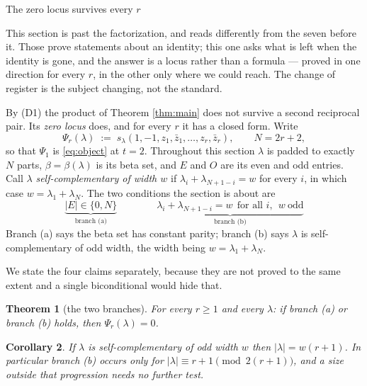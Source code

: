 \documentclass[11pt,reqno]{amsart}
\makeatletter
\renewcommand\section{\@startsection{section}{1}%
  \z@{\linespacing\@plus\linespacing}{.5\linespacing}%
  {\normalfont\large\bfseries\centering}}
\theoremstyle{plain}
\newtheorem{theorem}{Theorem}[section]
\newtheorem{corollary}[theorem]{Corollary}
\theoremstyle{definition}
\makeatother
\begin{document}
\section{The zero locus survives every $r$}\label{sec:zeros}

This section is past the factorization, and reads differently from the seven before it. Those prove
statements about an identity; this one asks what is left when the identity is gone, and the answer is
a locus rather than a formula --- proved in one direction for every $r$, in the other only where we
could reach. The change of register is the subject changing, not the standard.

By (D1) the product of Theorem \ref{thm:main} does not survive a second reciprocal pair. Its
\emph{zero locus} does, and for every $r$ it has a closed form. Write
\begin{equation}\label{eq:psir}
\Psi_r(\lambda)\;:=\;s_\lambda(1,-1,z_1,\bar z_1,\dots,z_r,\bar z_r),\qquad N=2r+2,
\end{equation}
so that $\Psi_1$ is \eqref{eq:object} at $t=2$. Throughout this section $\lambda$ is padded to
exactly $N$ parts, $\beta=\beta(\lambda)$ is its beta set, and $E$ and $O$ are its even and odd
entries. Call $\lambda$ \emph{self-complementary of width $w$} if $\lambda_i+\lambda_{N+1-i}=w$ for
every $i$, in which case $w=\lambda_1+\lambda_N$. The two conditions the section is about are
\begin{equation}\label{eq:branches}
\boxed{\;\;
\underbrace{|E|\in\{0,N\}}_{\text{branch (a)}}
\qquad\qquad
\underbrace{\lambda_i+\lambda_{N+1-i}=w\ \ \text{for all }i,\ \ w\ \text{odd}}_{\text{branch (b)}}
\;\;}
\end{equation}
Branch (a) says the beta set has constant parity; branch (b) says $\lambda$ is self-complementary of
odd width, the width being $w=\lambda_1+\lambda_N$.

We state the four claims separately, because they are not proved to the same extent and a single
biconditional would hide that.

\begin{theorem}[the two branches]\label{thm:zeros}
For every $r\ge1$ and every $\lambda$: if branch {\rm(a)} or branch {\rm(b)} holds, then
$\Psi_r(\lambda)=0$.
\end{theorem}

\begin{corollary}\label{cor:sizes}
If $\lambda$ is self-complementary of odd width $w$ then $|\lambda|=w(r+1)$. In particular branch
{\rm(b)} occurs only for $|\lambda|\equiv r+1 \pmod{2(r+1)}$, and a size outside that progression
needs no further test.
\end{corollary}
\end{document}
